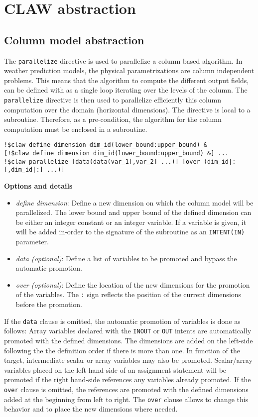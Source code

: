 \section{CLAW abstraction}


\subsection{Column model abstraction}

The \lstinline!parallelize! directive is used to parallelize a column based
algorithm. In weather prediction models, the physical parametrizations are column
independent problems. This means that the algorithm to compute the different
output fields, can be defined with as a single loop iterating over the levels of
the column.
The \lstinline!parallelize! directive is then used to parallelize efficiently this 
column computation over the domain (horizontal 
dimensions).
The directive is local to a subroutine. Therefore, as a pre-condition, the algorithm 
for the column computation must be enclosed in a subroutine.

\begin{lstlisting}
!$claw define dimension dim_id(lower_bound:upper_bound) &
[!$claw define dimension dim_id(lower_bound:upper_bound) &] ...
!$claw parallelize [data(data(var_1[,var_2] ...)] [over (dim_id|:[,dim_id|:] ...)]
\end{lstlisting}

\textbf{Options and details}
\begin{itemize}
\item \textit{define dimension}: Define a new dimension on which the column
model will be parallelized. The lower bound and upper bound of the defined
dimension can be either an integer constant or an integer variable. If a
variable is given, it will be added in-order to the signature of the subroutine
as an \lstinline!INTENT(IN)! parameter.
\item \textit{data (optional)}: Define a list of variables to be promoted and 
bypass the automatic promotion.
\item \textit{over (optional)}: Define the location of the new dimensions for 
the promotion of the variables. The \lstinline!:! sign reflects the position 
of the current dimensions before the promotion.
\end{itemize}

If the \lstinline!data! clause is omitted, the automatic promotion of variables 
is done as follows:
Array variables declared with the \lstinline!INOUT! or \lstinline!OUT! intents
are automatically promoted with the defined dimensions. The dimensions are
added on the left-side following the the definition order if there is more 
than one.
In function of the target, intermediate scalar or array variables may also be 
promoted.
Scalar/array variables placed on the left hand-side of an assignment statement 
will be promoted if the right hand-side references any variables already promoted.
If the \lstinline!over! clause is omitted, the references are promoted with the
defined dimensions added at the beginning from left to right. The
\lstinline!over! clause allows to change this behavior and to place the new
dimensions where needed.

